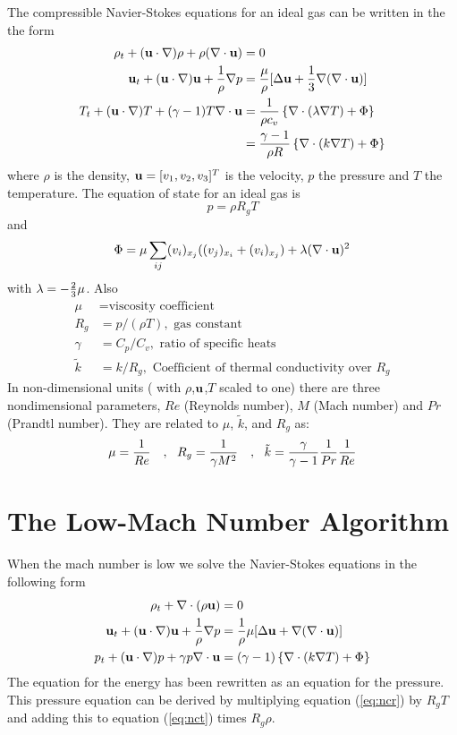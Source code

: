 \documentclass[10pt]{article}
\begin{document}
The compressible Navier-Stokes equations for an ideal gas can be
written in the the form
\begin{align}
   \rho_t + ({\bf u}\cdot\nabla)\rho + \rho( \nabla\cdot{\bf u}) &= 0           \label{eq:ncr} \\
   {\bf u}_t +({\bf u}\cdot\nabla){\bf u} + {1\over \rho} \nabla p
  &= {\mu\over \rho}[\Delta {\bf u} + {1\over 3}\nabla(\nabla\cdot{\bf u})]  \label{eq:ncu}\\
   T_t + ({\bf u}\cdot\nabla) T +(\gamma-1) T \nabla\cdot{\bf u}
       & = {1\over\rho c_v} \left\{ \nabla\cdot( \lambda \nabla T) + \Phi \right\}  \\
       & = {\gamma-1\over \rho R}  \left\{ \nabla\cdot( k \nabla T) + \Phi \right\}   \label{eq:nct}
\end{align}
where $\rho$ is the density, ${\bf u}=[v_1,v_2,v_3]^T$ is the velocity,
 $p$ the pressure
and $T$ the temperature.
The equation of state for an ideal gas is
$$
     p = \rho R_g T
$$
and
$$
\Phi = \mu
\sum_{ij} (v_i)_{x_j} ((v_j)_{x_i} + (v_i)_{x_j} )
+ \lambda (\nabla\cdot{\bf u})^2
$$
with $\lambda=-{2\over3} \mu$.
Also
$$
\begin{array}{rl}
 \mu  &= \mbox{viscosity coefficient} \\
 R_g  & = p/(\rho T), \mbox{ gas constant} \\
   \gamma & = C_p/C_v, \mbox{ ratio of specific heats} \\
\tilde{k}&=k/R_g,\mbox{ Coefficient of thermal conductivity over } R_g
\end{array}
$$
In non-dimensional units ( with $\rho$,${\bf u}$,$T$ scaled to one) there are
three nondimensional parameters, $Re$ (Reynolds number),
$M$ (Mach number)
and $Pr$ (Prandtl number). They are related to $\mu$,
$\tilde{k}$, and $R_g$ as:
$$
           \mu    = {1\over Re}   ~~~,~~
            R_g   = {1 \over \gamma M^2}   ~~~,~~
      \tilde{k}   = {\gamma \over \gamma-1} {1\over Pr} {1\over Re}
$$



\section{The Low-Mach Number Algorithm}


When the mach number is low we solve the Navier-Stokes equations in the following form
\begin{align*}
   \rho_t + \nabla\cdot(\rho {\bf u}) &= 0 \\
   {\bf u}_t + ({\bf u}\cdot\nabla){\bf u} + {1\over\rho}\nabla p &= {1\over\rho} \mu [\Delta {\bf u} + \nabla(\nabla\cdot{\bf u}) ] \\
   p_t + ({\bf u}\cdot\nabla) p + \gamma p \nabla\cdot{\bf u} &= 
           (\gamma-1)\left\{  \nabla\cdot( k \nabla T) + \Phi \right\} 
\end{align*}
The equation for the energy has been rewritten as an equation for the pressure. This pressure equation can be 
derived by multiplying equation (\ref{eq:ncr}) by $R_gT$ and adding this to equation (\ref{eq:nct}) times
$R_g\rho$.
\end{document}
